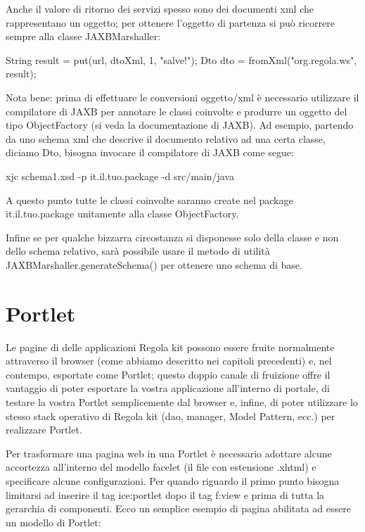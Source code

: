 Anche il valore di ritorno dei servizi spesso sono dei documenti xml che rappresentano un oggetto; per ottenere l'oggetto di partenza si può ricorrere sempre alla classe 
 JAXBMarshaller:

\begin{java}
 String result = put(url, dtoXml, 1, "salve!");
 Dto dto = fromXml("org.regola.ws", result);
 
\end{java} 

Nota bene: prima di effettuare le conversioni oggetto/xml è  necessario utilizzare il compilatore di JAXB per annotare le classi coinvolte e produrre un oggetto del tipo ObjectFactory (si veda la documentazione di JAXB). Ad esempio, partendo da uno schema xml che descrive il documento relativo ad una certa classe, diciamo Dto, bisogna invocare il compilatore di JAXB come segue:

\begin{bash}
 xjc schema1.xsd -p it.il.tuo.package -d src/main/java  
\end{bash}
 


A questo punto tutte le classi coinvolte saranno create nel package it.il.tuo.package unitamente alla classe ObjectFactory.

Infine se per qualche bizzarra circostanza si disponesse solo della classe e non dello schema relativo, sarà possibile usare il metodo di utilità JAXBMarshaller.generateSchema()  per ottenere uno schema di base.


\section{Portlet}
Le pagine di delle applicazioni Regola kit possono essere fruite normalmente attraverso il browser (come abbiamo descritto nei capitoli precedenti) e, nel contempo, esportate come Portlet; questo doppio canale di fruizione offre il vantaggio di poter esportare la vostra applicazione all'interno di portale, di testare la vostra Portlet semplicemente dal browser e, infine, di poter utilizzare lo stesso stack operativo di Regola kit  (dao, manager, Model Pattern, ecc.) per realizzare Portlet.

Per trasformare una pagina web in una Portlet è necessario adottare alcune accortezza all'interno del  modello facelet (il file con estensione .xhtml) e specificare alcune configurazioni. Per quando riguardo il primo punto bisogna limitarsi ad inserire il tag ice:portlet dopo il tag f:view e prima di tutta la gerarchia di componenti. Ecco un semplice esempio di pagina abilitata ad essere un modello di Portlet:

